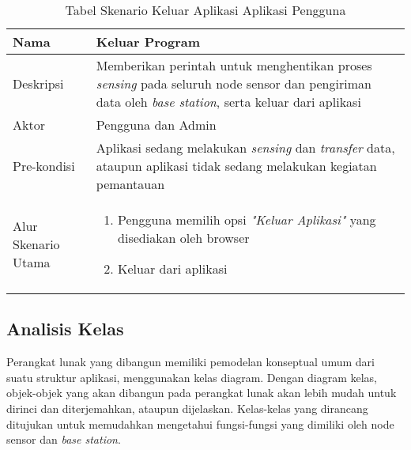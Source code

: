     \begin{table}[H]
        \centering
        \caption{Tabel Skenario Keluar Aplikasi Aplikasi Pengguna}
        \begin{tabular}{|p{3cm}|p{10cm}|}
        \hline
            Nama & Keluar Program\\
        \hline 
        \hline
            Deskripsi & Memberikan perintah untuk menghentikan proses \textit{sensing} pada seluruh node sensor dan pengiriman data oleh \textit{base station}, serta keluar dari aplikasi\\
        \hline
            Aktor & Pengguna dan Admin \\
        \hline
            Pre-kondisi & Aplikasi sedang melakukan \textit{sensing} dan \textit{transfer} data, ataupun aplikasi tidak sedang melakukan kegiatan pemantauan \\
        \hline
            Alur Skenario Utama & 
             \begin{enumerate}
                \item Pengguna memilih opsi \textit{"Keluar Aplikasi"} yang disediakan oleh browser
 
                \item Keluar dari aplikasi
            \end{enumerate}\\
        \hline
        \end{tabular}
        \label{tab:skenario4}
    \end{table}
     
    
\subsection{Analisis Kelas} \label{Analisis Kelas}
Perangkat lunak yang dibangun memiliki pemodelan konseptual umum dari suatu struktur aplikasi, menggunakan kelas diagram. Dengan diagram kelas, objek-objek yang akan dibangun pada perangkat lunak akan lebih mudah untuk dirinci dan diterjemahkan, ataupun dijelaskan. Kelas-kelas yang dirancang ditujukan untuk memudahkan mengetahui fungsi-fungsi yang dimiliki oleh node sensor dan \textit{base station}.

